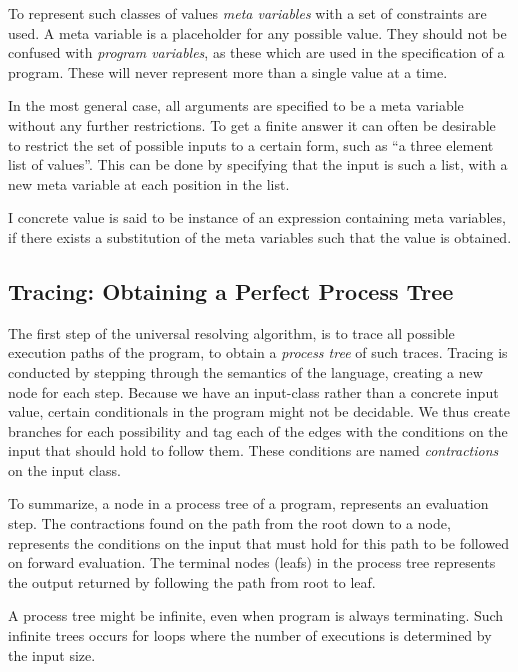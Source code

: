 \documentclass[10pt]{../sigplanconf}
\begin{document}
To represent such classes of values \textit{meta variables} with a set
of constraints are used. A meta variable is a placeholder for any
possible value. They should not be confused with \textit{program
  variables}, as these which are used in the specification of a
program. These will never represent more than a single value at a
time.

In the most general case, all arguments are specified to be a meta
variable without any further restrictions. To get a finite answer it
can often be desirable to restrict the set of possible inputs to a
certain form, such as ``a three element list of values''. This can be
done by specifying that the input is such a list, with a new
meta variable at each position in the list.

I concrete value is said to be instance of an expression containing
meta variables, if there exists a substitution of the meta variables
such that the value is obtained. 

\subsection{Tracing: Obtaining a Perfect Process Tree}
The first step of the universal resolving algorithm, is to trace all
possible execution paths of the program, to obtain a \textit{process
  tree} of such traces. Tracing is conducted by stepping through the
semantics of the language, creating a new node for each step. Because
we have an input-class rather than a concrete input value, certain
conditionals in the program might not be decidable. We thus create
branches for each possibility and tag each of the edges with the
conditions on the input that should hold to follow them. These
conditions are named \textit{contractions} on the input class.

To summarize, a node in a process tree of a program, represents an
evaluation step. The contractions found on the path from the root down
to a node, represents the conditions on the input that must hold for
this path to be followed on forward evaluation. The terminal nodes
(leafs) in the process tree represents the output returned by
following the path from root to leaf.

A process tree might be infinite, even when program is always
terminating. Such infinite trees occurs for loops where the number of
executions is determined by the input size.
\end{document}
